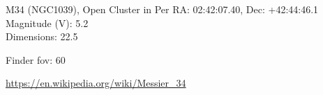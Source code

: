 \begin{block}{M34 (NGC1039), Open Cluster in Per}
    RA: 02:42:07.40, Dec: +42:44:46.1 \\ 
    Magnitude (V): 5.2 \\ 
    Dimensions: 22.5 

    Finder fov: 60 

    \url{https://en.wikipedia.org/wiki/Messier_34} 
\end{block}